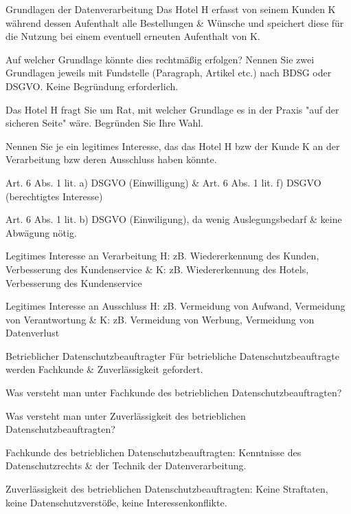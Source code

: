 \documentclass{article}
\begin{document}
\begin{eexercises}{Grundlagen der Datenverarbeitung}{
    Das Hotel H erfasst von seinem Kunden K während dessen Aufenthalt alle Bestellungen \& Wünsche und speichert diese für die Nutzung bei einem eventuell erneuten Aufenthalt von K.
  }
  \item Auf welcher Grundlage könnte dies rechtmäßig erfolgen? Nennen Sie zwei Grundlagen jeweils mit Fundstelle (Paragraph, Artikel etc.) nach BDSG oder DSGVO. Keine Begründung erforderlich.
  \item Das Hotel H fragt Sie um Rat, mit welcher Grundlage es in der Praxis "auf der sicheren Seite" wäre. Begründen Sie Ihre Wahl.
  \item Nennen Sie je ein legitimes Interesse, das das Hotel H bzw der Kunde K an der Verarbeitung bzw deren Ausschluss haben könnte.
\end{eexercises}

\begin{solutions}
  \item Art. 6 Abs. 1 lit. a) DSGVO (Einwilligung) \& Art. 6 Abs. 1 lit. f) DSGVO (berechtigtes Interesse)
  \item Art. 6 Abs. 1 lit. b) DSGVO (Einwiligung), da wenig Auslegungsbedarf \& keine Abwägung nötig.
  \item
  Legitimes Interesse an Verarbeitung H: zB. Wiedererkennung des Kunden, Verbesserung des Kundenservice \& K: zB. Wiedererkennung des Hotels, Verbesserung des Kundenservice\par
  Legitimes Interesse an Ausschluss H: zB. Vermeidung von Aufwand, Vermeidung von Verantwortung \& K: zB. Vermeidung von Werbung, Vermeidung von Datenverlust
\end{solutions}

\begin{eexercises}{Betrieblicher Datenschutzbeauftragter}{
    Für betriebliche Datenschutzbeauftragte werden Fachkunde \& Zuverlässigkeit gefordert.
  }
  \item Was versteht man unter Fachkunde des betrieblichen Datenschutzbeauftragten?
  \item Was versteht man unter Zuverlässigkeit des betrieblichen Datenschutzbeauftragten?
\end{eexercises}

\begin{solutions}
  \item Fachkunde des betrieblichen Datenschutzbeauftragten: Kenntnisse des Datenschutzrechts \& der Technik der Datenverarbeitung.
  \item Zuverlässigkeit des betrieblichen Datenschutzbeauftragten: Keine Straftaten, keine Datenschutzverstöße, keine Interessenkonflikte.
\end{solutions}
\end{document}
